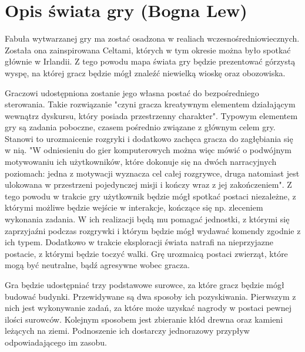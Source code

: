 \section{Opis świata gry (Bogna Lew)}
Fabuła wytwarzanej gry ma zostać osadzona w realiach wczesnośredniowiecznych. Została ona zainspirowana Celtami, których
w tym okresie można było spotkać głównie w Irlandii. Z tego powodu mapa świata gry będzie prezentować górzystą wyspę, na
której gracz będzie mógł znaleźć niewielką wioskę oraz obozowiska.

Graczowi udostępniona zostanie jego własna postać do bezpośredniego sterowania. Takie rozwiązanie "czyni gracza
kreatywnym elementem działającym wewnątrz dyskursu, który posiada przestrzenny charakter"\cite{olbrzymwcieniu}. Typowym
elementem gry są zadania poboczne, czasem pośrednio związane z głównym celem gry. Stanowi to urozmaicenie rozgryki i
dodatkowo zachęca gracza do zagłębiania się w nią. "W odniesieniu do gier komputerowych można więc mówić o podwójnym
motywowaniu ich użytkowników, które dokonuje się na dwóch narracyjnych poziomach: jedna z motywacji wyznacza cel całej
rozgrywce, druga natomiast jest ulokowana w przestrzeni pojedynczej misji i kończy wraz z jej zakończeniem"\cite{olbrzymwcieniu}.
Z tego powodu w trakcie gry użytkownik będzie mógł spotkać postaci niezależne, z którymi możliwe będzie wejście w interakcje, kończące
się np. zleceniem wykonania zadania. W ich realizacji będą mu pomagać jednostki, z którymi się zaprzyjaźni podczas
rozgrywki i którym będzie mógł wydawać komendy zgodnie z ich typem. Dodatkowo w trakcie eksploracji świata natrafi na
nieprzyjazne postacie, z którymi będzie toczyć walki. Grę urozmaicą postaci zwierząt, które mogą być neutralne, bądź
agresywne wobec gracza.

Gra będzie udostępniać trzy podstawowe surowce, za które gracz będzie mógł budować budynki. Przewidywane są dwa sposoby
ich pozyskiwania. Pierwszym z nich jest wykonywanie zadań, za które może uzyskać nagrody w postaci pewnej ilości
surowców. Kolejnym sposobem jest zbieranie kłód drewna oraz kamieni leżących na ziemi. Podnoszenie ich dostarczy
jednorazowy przypływ odpowiadającego im zasobu.
